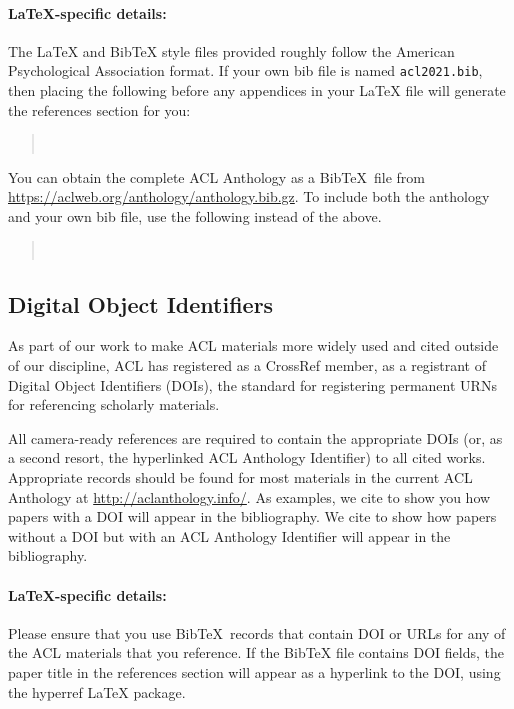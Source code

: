 \documentclass[11pt,a4paper]{article}
\begin{document}
\paragraph{\LaTeX-specific details:}
The \LaTeX{} and Bib\TeX{} style files provided roughly follow the American Psychological Association format.
If your own bib file is named \texttt{\small acl2021.bib}, then placing the following before any appendices in your \LaTeX{}  file will generate the references section for you:
\begin{quote}\small
\verb||\\
\verb||
\end{quote}

You can obtain the complete ACL Anthology as a Bib\TeX\ file from \url{https://aclweb.org/anthology/anthology.bib.gz}.
To include both the anthology and your own bib file, use the following instead of the above.
\begin{quote}\small
\verb||\\
\verb||
\end{quote}


\subsection{Digital Object Identifiers}
As part of our work to make ACL materials more widely used and cited outside of our discipline, ACL has registered as a CrossRef member, as a registrant of Digital Object Identifiers (DOIs), the standard for registering permanent URNs for referencing scholarly materials.

All camera-ready references are required to contain the appropriate DOIs (or, as a second resort, the hyperlinked ACL Anthology Identifier) to all cited works.
Appropriate records should be found for most materials in the current ACL Anthology at \url{http://aclanthology.info/}.
As examples, we cite \citep{goodman-etal-2016-noise} to show you how papers with a DOI will appear in the bibliography.
We cite \citep{harper-2014-learning} to show how papers without a DOI but with an ACL Anthology Identifier will appear in the bibliography.

\paragraph{\LaTeX-specific details:}
Please ensure that you use Bib\TeX\ records that contain DOI or URLs for any of the ACL materials that you reference.
If the Bib\TeX{} file contains DOI fields, the paper title in the references section will appear as a hyperlink to the DOI, using the hyperref \LaTeX{} package.
\end{document}
